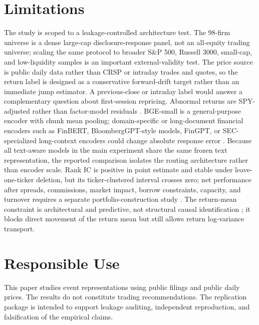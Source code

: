 \documentclass[10pt,letterpaper]{article}
\begin{document}
\section{Limitations}

The study is scoped to a leakage-controlled architecture test. The 98-firm universe is
a dense large-cap disclosure-response panel, not an all-equity trading universe; scaling the same
protocol to broader S\&P 500, Russell 3000, small-cap, and low-liquidity samples is an important
external-validity test. The price source is public daily data rather than CRSP or intraday trades
and quotes, so the return label is designed as a conservative forward-drift target rather than an
immediate jump estimator. A previous-close or intraday label would answer a complementary question
about first-session repricing. Abnormal returns are SPY-adjusted rather than factor-model residuals
\citep{fama1993common,carhart1997persistence}. BGE-small is a general-purpose encoder with chunk
mean pooling; domain-specific or long-document financial encoders such as FinBERT,
BloombergGPT-style models, FinGPT, or SEC-specialized long-context encoders could change absolute
response error \citep{araci2019finbert,wu2023bloomberggpt,yang2023fingpt}. Because all text-aware
models in the main experiment share the same frozen text representation, the reported comparison
isolates the routing architecture rather than encoder scale. Rank IC is positive in point estimate
and stable under leave-one-ticker deletion, but its ticker-clustered interval crosses zero; net
performance after spreads, commissions, market impact, borrow constraints, capacity, and turnover
requires a separate portfolio-construction study
\citep{grinold2000active,novymarx2016taxonomy,frazzini2018trading,lopezdeprado2018advances}. The
return-mean constraint is architectural and predictive, not structural causal
identification \citep{rubin1974estimating,imbens2015causal}; it blocks direct movement of the
return mean but still allows return log-variance transport.

\section{Responsible Use}

This paper studies event representations using public filings and public daily prices. The results
do not constitute trading recommendations. The replication package is intended to support leakage
auditing, independent reproduction, and falsification of the empirical claims.
\end{document}
